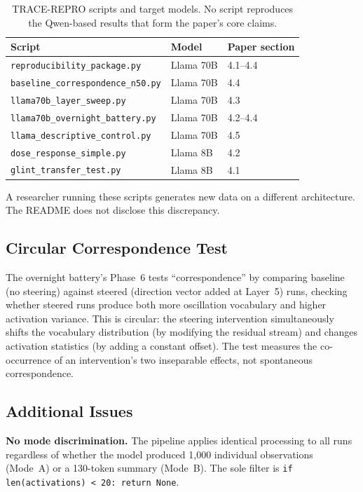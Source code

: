 \documentclass[11pt]{article}
\begin{document}
\begin{table}[t]
\centering
\small
\begin{tabular}{lll}
\toprule
Script & Model & Paper section \\
\midrule
\texttt{reproducibility\_package.py} & Llama 70B & 4.1--4.4 \\
\texttt{baseline\_correspondence\_n50.py} & Llama 70B & 4.4 \\
\texttt{llama70b\_layer\_sweep.py} & Llama 70B & 4.3 \\
\texttt{llama70b\_overnight\_battery.py} & Llama 70B & 4.2--4.4 \\
\texttt{llama\_descriptive\_control.py} & Llama 70B & 4.5 \\
\texttt{dose\_response\_simple.py} & Llama 8B & 4.2 \\
\texttt{glint\_transfer\_test.py} & Llama 8B & 4.1 \\
\bottomrule
\end{tabular}
\caption{TRACE-REPRO scripts and target models. No script reproduces
the Qwen-based results that form the paper's core claims.}
\label{tab:scripts}
\end{table}

A researcher running these scripts generates new data on a different
architecture. The README does not disclose this discrepancy.

\subsection{Circular Correspondence Test}

The overnight battery's Phase~6 tests ``correspondence'' by comparing
baseline (no steering) against steered (direction vector added at
Layer~5) runs, checking whether steered runs produce both more
oscillation vocabulary and higher activation variance. This is circular:
the steering intervention simultaneously shifts the vocabulary
distribution (by modifying the residual stream) and changes activation
statistics (by adding a constant offset). The test measures the
co-occurrence of an intervention's two inseparable effects, not
spontaneous correspondence.

\subsection{Additional Issues}

\textbf{No mode discrimination.} The pipeline applies identical
processing to all runs regardless of whether the model produced 1,000
individual observations (Mode~A) or a 130-token summary (Mode~B). The
sole filter is \texttt{if len(activations) < 20: return None}.
\end{document}
